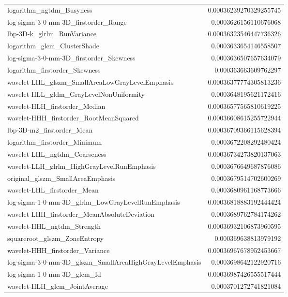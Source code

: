 {\begin{xltabular}[H]{\textwidth}{X r}
        logarithm\_ngtdm\_Busyness & 0.00036239270329255745 \\
        log-sigma-3-0-mm-3D\_firstorder\_Range & 0.0003626156110676068 \\
        lbp-3D-k\_glrlm\_RunVariance & 0.00036323546447736326 \\
        logarithm\_glcm\_ClusterShade & 0.0003633654146558507 \\
        log-sigma-3-0-mm-3D\_firstorder\_Skewness & 0.0003636507657634079 \\
        logarithm\_firstorder\_Skewness & 0.000363663609762297 \\
        wavelet-LHL\_glszm\_SmallAreaLowGrayLevelEmphasis & 0.00036377774305813236 \\
        wavelet-HLL\_gldm\_GrayLevelNonUniformity & 0.0003648195621172416 \\
        wavelet-HLH\_firstorder\_Median & 0.00036577565810619225 \\
        wavelet-HHH\_firstorder\_RootMeanSquared & 0.00036608615255722944 \\
        lbp-3D-m2\_firstorder\_Mean & 0.00036709366115628394 \\
        logarithm\_firstorder\_Minimum & 0.0003672208292480424 \\
        wavelet-LHL\_ngtdm\_Coarseness & 0.00036734273820137063 \\
        wavelet-LLH\_glrlm\_HighGrayLevelRunEmphasis & 0.0003676649687876086 \\
        original\_glszm\_SmallAreaEmphasis & 0.0003679514702600269 \\
        wavelet-LHL\_firstorder\_Mean & 0.0003680961168773666 \\
        log-sigma-1-0-mm-3D\_glrlm\_LowGrayLevelRunEmphasis & 0.00036818883192444424 \\
        wavelet-LHH\_firstorder\_MeanAbsoluteDeviation & 0.0003689762784174262 \\
        wavelet-HHL\_ngtdm\_Strength & 0.00036932106873960595 \\
        squareroot\_glszm\_ZoneEntropy & 0.000369638813979192 \\
        wavelet-HHH\_firstorder\_Variance & 0.00036967678952453667 \\
        log-sigma-3-0-mm-3D\_glszm\_SmallAreaHighGrayLevelEmphasis & 0.0003698642122920716 \\
        log-sigma-1-0-mm-3D\_glcm\_Id & 0.00036987426555517444 \\
        wavelet-HLH\_glcm\_JointAverage & 0.0003701272741821084 \\

\end{xltabular}}
